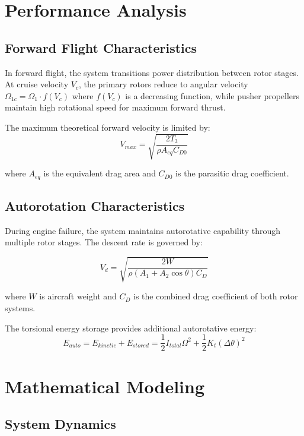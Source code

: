 \documentclass[12pt,a4paper]{article}
\begin{document}
\section{Performance Analysis}

\subsection{Forward Flight Characteristics}

In forward flight, the system transitions power distribution between rotor stages. At cruise velocity $V_c$, the primary rotors reduce to angular velocity $\Omega_{1c} = \Omega_1 \cdot f(V_c)$ where $f(V_c)$ is a decreasing function, while pusher propellers maintain high rotational speed for maximum forward thrust.

The maximum theoretical forward velocity is limited by:
\begin{equation}
V_{max} = \sqrt{\frac{2T_3}{\rho A_{eq} C_{D0}}}
\end{equation}

where $A_{eq}$ is the equivalent drag area and $C_{D0}$ is the parasitic drag coefficient.

\subsection{Autorotation Characteristics}

During engine failure, the system maintains autorotative capability through multiple rotor stages. The descent rate is governed by:

\begin{equation}
V_d = \sqrt{\frac{2W}{\rho(A_1 + A_2 \cos\theta)C_D}}
\end{equation}

where $W$ is aircraft weight and $C_D$ is the combined drag coefficient of both rotor systems.

The torsional energy storage provides additional autorotative energy:
\begin{equation}
E_{auto} = E_{kinetic} + E_{stored} = \frac{1}{2}I_{total}\Omega^2 + \frac{1}{2}K_t(\Delta\theta)^2
\end{equation}

\section{Mathematical Modeling}

\subsection{System Dynamics}
\end{document}
